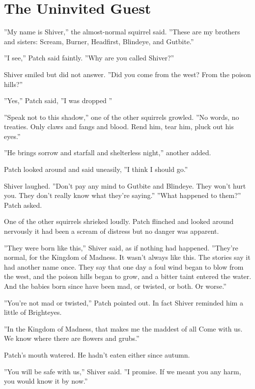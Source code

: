 \documentclass[12pt]{book}
\begin{document}
\section{The Uninvited Guest}

 ''My name is Shiver,'' the almost-normal squirrel said. ''These are my brothers and sisters: Scream, Burner, Headfirst, Blindeye, and Gutbite.''\par
 ''I see,'' Patch said faintly. ''Why are you called Shiver?''\par
 Shiver smiled but did not answer. ''Did you come from the west? From the poison hills?''\par
 ''Yes,'' Patch said, ''I was dropped %
''\par
 ''Speak not to this shadow,'' one of the other squirrels growled. ''No words, no treaties. Only claws and fangs and blood. Rend him, tear him, pluck out his eyes.''\par
 ''He brings sorrow and starfall and shelterless night,'' another added.\par
 Patch looked around and said uneasily, ''I think I should go.''\par
 Shiver laughed. ''Don't pay any mind to Gutbite and Blindeye. They won't hurt you. They don't really know what they're saying.'' ''What happened to them?'' Patch asked.\par
 One of the other squirrels shrieked loudly. Patch flinched and looked around nervously %
 it had been a scream of distress %
 but no danger was apparent.\par
 ''They were born like this,'' Shiver said, as if nothing had happened. ''They're normal, for the Kingdom of Madness. It wasn't always like this. The stories say it had another name once. They say that one day a foul wind began to blow from the west, and the poison hills began to grow, and a bitter taint entered the water. And the babies born since have been mad, or twisted, or both. Or worse.''\par
 ''You're not mad or twisted,'' Patch pointed out. In fact Shiver reminded him a little of Brighteyes.\par
 ''In the Kingdom of Madness, that makes me the maddest of all %
 Come with us. We know where there are flowers and grubs.''\par
 Patch's mouth watered. He hadn't eaten either since autumn.\par
 ''You will be safe with us,'' Shiver said. ''I promise. If we meant you any harm, you would know it by now.''\par
\end{document}
